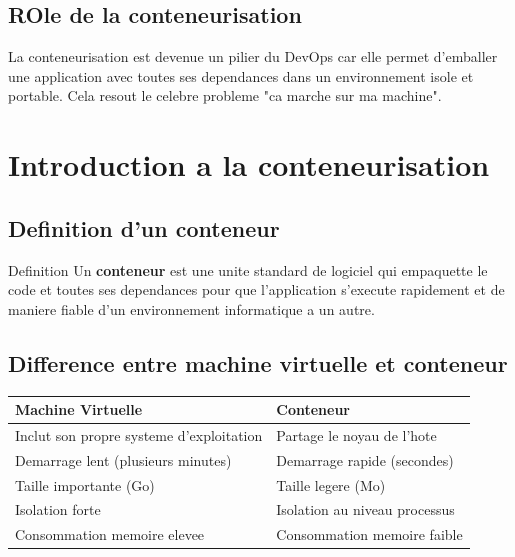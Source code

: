\documentclass[a4paper,12pt]{article}
\begin{document}
\subsection{ROle de la conteneurisation}
La conteneurisation est devenue un pilier du DevOps car elle permet d'emballer une application avec toutes ses dependances dans un environnement isole et portable. Cela resout le celebre probleme "ca marche sur ma machine".

\section{Introduction a la conteneurisation}

\subsection{Definition d'un conteneur}
\begin{importantbox}{Definition}
Un \textbf{conteneur} est une unite standard de logiciel qui empaquette le code et toutes ses dependances pour que l'application s'execute rapidement et de maniere fiable d'un environnement informatique a un autre.
\end{importantbox}

\subsection{Difference entre machine virtuelle et conteneur}

\begin{center}
\begin{tabular}{|p{5cm}|p{5cm}|}
    \hline
    \textbf{Machine Virtuelle} & \textbf{Conteneur} \\
    \hline
    Inclut son propre systeme d'exploitation & Partage le noyau de l'hote \\
    Demarrage lent (plusieurs minutes) & Demarrage rapide (secondes) \\
    Taille importante (Go) & Taille legere (Mo) \\
    Isolation forte & Isolation au niveau processus \\
    Consommation memoire elevee & Consommation memoire faible \\
    \hline
\end{tabular}
\end{center}
\end{document}
